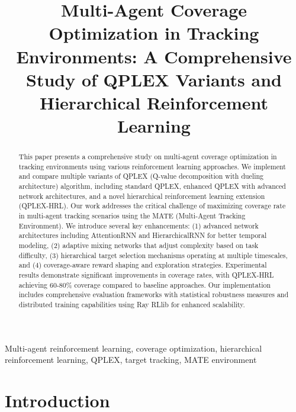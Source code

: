 \documentclass[conference]{IEEEtran}
\begin{document}
\title{Multi-Agent Coverage Optimization in Tracking Environments: A Comprehensive Study of QPLEX Variants and Hierarchical Reinforcement Learning}

\author{
}

\maketitle

\begin{abstract}
This paper presents a comprehensive study on multi-agent coverage optimization in tracking environments using various reinforcement learning approaches. We implement and compare multiple variants of QPLEX (Q-value decomposition with dueling architecture) algorithm, including standard QPLEX, enhanced QPLEX with advanced network architectures, and a novel hierarchical reinforcement learning extension (QPLEX-HRL). Our work addresses the critical challenge of maximizing coverage rate in multi-agent tracking scenarios using the MATE (Multi-Agent Tracking Environment). We introduce several key enhancements: (1) advanced network architectures including AttentionRNN and HierarchicalRNN for better temporal modeling, (2) adaptive mixing networks that adjust complexity based on task difficulty, (3) hierarchical target selection mechanisms operating at multiple timescales, and (4) coverage-aware reward shaping and exploration strategies. Experimental results demonstrate significant improvements in coverage rates, with QPLEX-HRL achieving 60-80\% coverage compared to baseline approaches. Our implementation includes comprehensive evaluation frameworks with statistical robustness measures and distributed training capabilities using Ray RLlib for enhanced scalability.
\end{abstract}

\begin{IEEEkeywords}
Multi-agent reinforcement learning, coverage optimization, hierarchical reinforcement learning, QPLEX, target tracking, MATE environment
\end{IEEEkeywords}

\section{Introduction}
\end{document}
